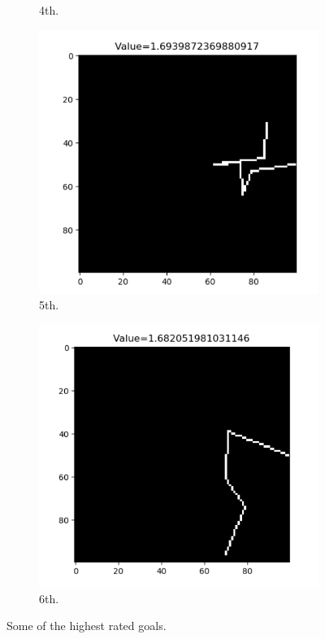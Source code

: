 \documentclass{mcmthesis}
\begin{document}
\begin{figure}[h]
\begin{subfigure}[b]{0.16\textwidth}
		\caption{4th.}
	\end{subfigure}
	\begin{subfigure}[b]{0.16\textwidth}
		\includegraphics[width=\textwidth]{figures/shot5.png}
		\caption{5th.}
	\end{subfigure}
	\begin{subfigure}[b]{0.16\textwidth}
		\includegraphics[width=\textwidth]{figures/shot6.png}
		\caption{6th.}
	\end{subfigure}
	\caption{Some of the highest rated goals.}
	\label{fig:highest_goal}
\end{figure}
\end{document}
